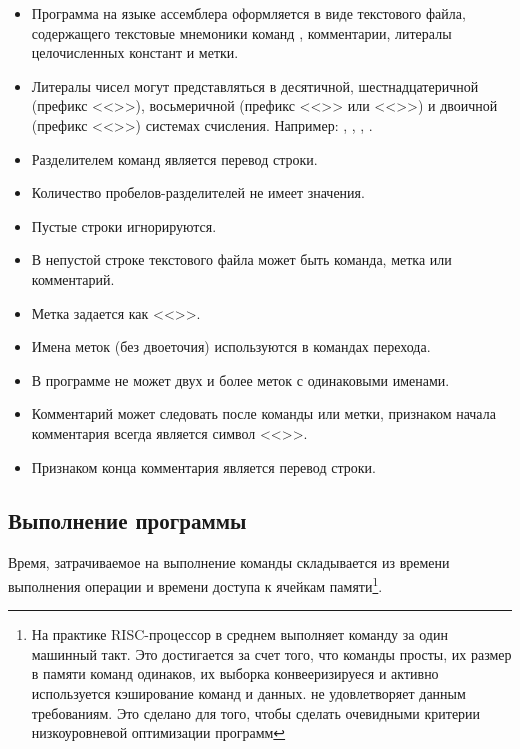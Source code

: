 \begin{itemize}
    \item Программа на языке ассемблера {\MyProc} оформляется в виде текстового файла, содержащего текстовые мнемоники команд \MyProc, комментарии, литералы целочисленных констант и метки.
    \item Литералы чисел могут представляться в десятичной, шестнадцатеричной (префикс <<>>), восьмеричной (префикс <<>> или <<>>) и двоичной (префикс <<>>) системах счисления. Например: , , , .
    \item Разделителем команд является перевод строки.
    \item Количество пробелов-разделителей не имеет значения.
    \item Пустые строки игнорируются.
    \item В непустой строке текстового файла может быть команда, метка или комментарий.
    \item Метка задается как <<>>.
    \item Имена меток (без двоеточия) используются в командах перехода.
    \item В программе не может двух и более меток с одинаковыми именами.
    \item Комментарий может следовать после команды или метки, признаком начала комментария всегда является символ <<\Machine{;}>>.
    \item Признаком конца комментария является перевод строки.
\end{itemize}


\subsection{Выполнение программы \MyProc}
\label{ch:risc:time}

Время, затрачиваемое на выполнение команды складывается из времени выполнения операции и времени доступа к ячейкам памяти\footnote{На практике RISC-процессор в среднем выполняет команду за один машинный такт. Это достигается за счет того, что команды просты, их размер в памяти команд одинаков, их выборка конвееризируеся и активно используется кэширование команд и данных. {\MyProc} не удовлетворяет данным требованиям. Это сделано для того, чтобы сделать очевидными критерии низкоуровневой оптимизации программ}.

